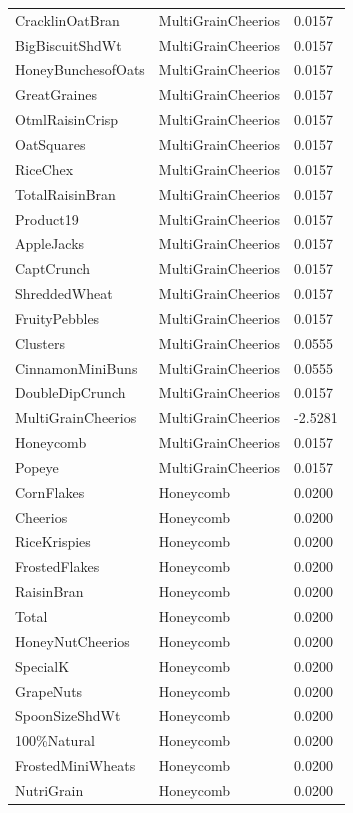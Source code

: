 \begin{table}[!htbp]
\begin{tabular}{lll}
\\
CracklinOatBran & MultiGrainCheerios & 0.0157
\\
BigBiscuitShdWt & MultiGrainCheerios & 0.0157
\\
HoneyBunchesofOats & MultiGrainCheerios & 0.0157
\\
GreatGraines & MultiGrainCheerios & 0.0157
\\
OtmlRaisinCrisp & MultiGrainCheerios & 0.0157
\\
OatSquares & MultiGrainCheerios & 0.0157
\\
RiceChex & MultiGrainCheerios & 0.0157
\\
TotalRaisinBran & MultiGrainCheerios & 0.0157
\\
Product19 & MultiGrainCheerios & 0.0157
\\
AppleJacks & MultiGrainCheerios & 0.0157
\\
CaptCrunch & MultiGrainCheerios & 0.0157
\\
ShreddedWheat & MultiGrainCheerios & 0.0157
\\
FruityPebbles & MultiGrainCheerios & 0.0157
\\
Clusters & MultiGrainCheerios & 0.0555
\\
CinnamonMiniBuns & MultiGrainCheerios & 0.0555
\\
DoubleDipCrunch & MultiGrainCheerios & 0.0157
\\
MultiGrainCheerios & MultiGrainCheerios & -2.5281
\\
Honeycomb & MultiGrainCheerios & 0.0157
\\
Popeye & MultiGrainCheerios & 0.0157
\\
CornFlakes & Honeycomb & 0.0200
\\
Cheerios & Honeycomb & 0.0200
\\
RiceKrispies & Honeycomb & 0.0200
\\
FrostedFlakes & Honeycomb & 0.0200
\\
RaisinBran & Honeycomb & 0.0200
\\
Total & Honeycomb & 0.0200
\\
HoneyNutCheerios & Honeycomb & 0.0200
\\
SpecialK & Honeycomb & 0.0200
\\
GrapeNuts & Honeycomb & 0.0200
\\
SpoonSizeShdWt & Honeycomb & 0.0200
\\
100\%Natural & Honeycomb & 0.0200
\\
FrostedMiniWheats & Honeycomb & 0.0200
\\
NutriGrain & Honeycomb & 0.0200

\end{tabular}
\end{table}
